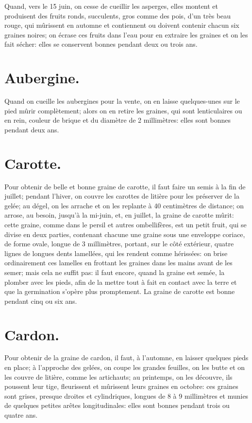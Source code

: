 \documentclass[10pt,a4paper]{book}
\begin{document}
Quand, vers le 15 juin, on cesse de cueillir les asperges, elles montent et produisent des fruits ronds, succulents, gros comme des pois, d'un très beau rouge, qui mûrissent en automne et contiennent ou doivent contenir chacun six graines noires; on écrase ces fruits dans l'eau pour en extraire les graines et on les fait sécher: elles se conservent bonnes pendant deux ou trois ans.

\section{Aubergine.}

Quand on cueille les aubergines pour la vente, on en laisse quelques-unes sur le pied mûrir complètement; alors on en retire les graines, qui sont lenticulaires ou en rein, couleur de brique et du diamètre de 2 millimètres: elles sont bonnes pendant deux ans.

\section{Carotte.}

Pour obtenir de belle et bonne graine de carotte, il faut faire un semis à la fin de juillet; pendant l'hiver, on couvre les carottes de litière pour les préserver de la gelée; au dégel, on les arrache et on les replante à 40 centimètres de distance; on arrose, au besoin, jusqu'à la mi-juin, et, en juillet, la graine de carotte mûrit: cette graine, comme dans le persil et autres ombellifères, est un petit fruit, qui se divise en deux parties, contenant chacune une graine sous une enveloppe coriace, de forme ovale, longue de 3 millimètres, portant, sur le côté extérieur, quatre lignes de longues dents lamellées, qui les rendent comme hérissées: on brise ordinairement ces lamelles en frottant les graines dans les mains avant de les semer; mais cela ne suffit pas: il faut encore, quand la graine est semée, la plomber avec les pieds, afin de la mettre tout à fait en contact avec la terre et que la germination s'opère plus promptement. La graine de carotte est bonne pendant cinq ou six ans.

\section{Cardon.}

Pour obtenir de la graine de cardon, il faut, à l'automne, en laisser quelques pieds en place; à l'approche des gelées, on coupe les grandes feuilles, on les butte et on les couvre de litière, comme les artichauts; au printemps, on les découvre, ils poussent leur tige, fleurissent et mûrissent leurs graines en octobre: ces graines sont grises, presque droites et cylindriques, longues de 8 à 9 millimètres et munies de quelques petites arêtes longitudinales: elles sont bonnes pendant trois ou quatre ans.
\end{document}
